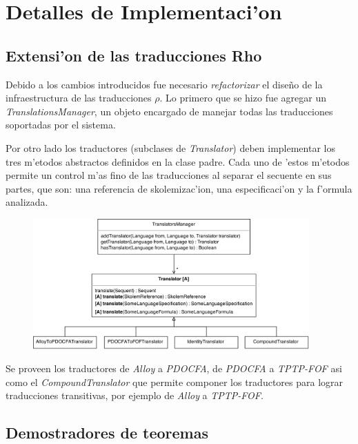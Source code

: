 \section{Detalles de Implementaci'on}
\subsection{Extensi'on de las traducciones Rho}


Debido a los cambios introducidos fue necesario \textit{refactorizar} el diseño de la infraestructura de las traducciones $\rho$. Lo primero que se hizo fue agregar un \textit{TranslationsManager}, un objeto encargado de manejar todas las traducciones soportadas por el sistema. 

Por otro lado los traductores (subclases de \textit{Translator}) deben implementar los tres m'etodos  abstractos definidos en la clase padre. Cada uno de 'estos m'etodos permite un control m'as fino de las traducciones al separar el secuente en sus partes, que son: una referencia de skolemizac'ion, una especificaci'on y la f'ormula analizada.

\begin{figure}[H]
	\includegraphics[width=400px, angle=90]{img/arq_traductores.png}
\end{figure}

Se proveen los traductores de \textit{Alloy} a \textit{PDOCFA}, de \textit{PDOCFA} a \textit{TPTP-FOF} asi como el \textit{CompoundTranslator} que permite componer los traductores para lograr traducciones transitivas, por ejemplo de \textit{Alloy} a \textit{TPTP-FOF}.


\subsection{Demostradores de teoremas}

